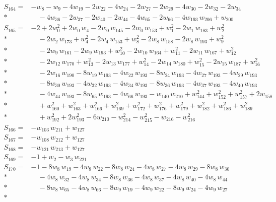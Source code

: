 \begin{align*}
S_{164}={}& -w_{8} - w_{9} - 4w_{19} - 2w_{22} - 4w_{24} - 2w_{27} - 2w_{29} - 4w_{30} - 2w_{32} - 2w_{34} \\*
&\quad  - 4w_{36} - 2w_{37} - 2w_{40} - 2w_{44} - 4w_{65} - 2w_{66} - 4w_{193}\,w_{206} + w_{200} \\[2pt]
S_{165}={}& -2 + 2w_{0}^{2} + 2w_{0}\,w_{4} - 2w_{0}\,w_{145} - 2w_{0}\,w_{153} + w_{1}^{2} - 2w_{1}\,w_{183} + w_{2}^{2} \\*
&\quad  - 2w_{2}\,w_{173} + w_{4}^{2} - 2w_{4}\,w_{153} + w_{8}^{2} - 2w_{8}\,w_{158} - 2w_{8}\,w_{193} + w_{9}^{2} \\*
&\quad  - 2w_{9}\,w_{161} - 2w_{9}\,w_{193} + w_{10}^{2} - 2w_{10}\,w_{164} + w_{11}^{2} - 2w_{11}\,w_{167} + w_{12}^{2} \\*
&\quad  - 2w_{12}\,w_{170} + w_{13}^{2} - 2w_{13}\,w_{177} + w_{14}^{2} - 2w_{14}\,w_{180} + w_{15}^{2} - 2w_{15}\,w_{187} + w_{16}^{2} \\*
&\quad  - 2w_{16}\,w_{190} - 8w_{19}\,w_{193} - 4w_{22}\,w_{193} - 8w_{24}\,w_{193} - 4w_{27}\,w_{193} - 4w_{29}\,w_{193} \\*
&\quad  - 8w_{30}\,w_{193} - 4w_{32}\,w_{193} - 4w_{34}\,w_{193} - 8w_{36}\,w_{193} - 4w_{37}\,w_{193} - 4w_{40}\,w_{193} \\*
&\quad  - 4w_{44}\,w_{193} - 8w_{65}\,w_{193} - 4w_{66}\,w_{193} - w_{140}\,w_{210} + w_{144}^{2} + w_{152}^{2} + w_{157}^{2} + 2w_{158} \\*
&\quad  + w_{160}^{2} + w_{163}^{2} + w_{166}^{2} + w_{169}^{2} + w_{172}^{2} + w_{176}^{2} + w_{179}^{2} + w_{182}^{2} + w_{186}^{2} + w_{189}^{2} \\*
&\quad  + w_{192}^{2} + 2w_{193}^{2} - 6w_{210} - w_{214}^{2} - w_{215}^{2} - w_{216} - w_{216}^{2} \\[2pt]
S_{166}={}& -w_{103}\,w_{211} + w_{127} \\[2pt]
S_{167}={}& -w_{108}\,w_{212} + w_{127} \\[2pt]
S_{168}={}& -w_{121}\,w_{213} + w_{127} \\[2pt]
S_{169}={}& -1 + w_{2} - w_{3}\,w_{221} \\[2pt]
S_{170}={}& -1 - 8w_{8}\,w_{19} - 4w_{8}\,w_{22} - 8w_{8}\,w_{24} - 4w_{8}\,w_{27} - 4w_{8}\,w_{29} - 8w_{8}\,w_{30} \\*
&\quad  - 4w_{8}\,w_{32} - 4w_{8}\,w_{34} - 8w_{8}\,w_{36} - 4w_{8}\,w_{37} - 4w_{8}\,w_{40} - 4w_{8}\,w_{44} \\*
&\quad  - 8w_{8}\,w_{65} - 4w_{8}\,w_{66} - 8w_{9}\,w_{19} - 4w_{9}\,w_{22} - 8w_{9}\,w_{24} - 4w_{9}\,w_{27} \\*

\end{align*}
